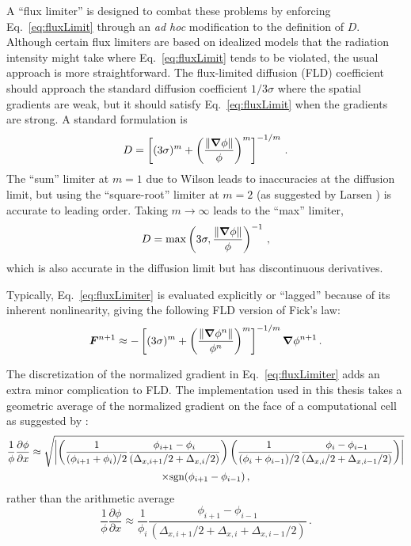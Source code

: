 A ``flux limiter'' is designed to combat these problems by enforcing
Eq.~\eqref{eq:fluxLimit} through an \emph{ad hoc} modification to
the definition of $D$.
Although certain flux limiters \cite{Lev1984} are based on
idealized models that the radiation intensity might take where
Eq.~\eqref{eq:fluxLimit} tends to be violated, the usual approach is more
straightforward. The flux-limited diffusion (FLD) coefficient should approach the
standard diffusion coefficient $1/3\sigma$ where the spatial gradients are weak,
but it should satisfy Eq.~\eqref{eq:fluxLimit} when the gradients are strong.
A standard formulation \cite{Ols2000} is
\begin{equation} \label{eq:fluxLimiter}
  D = \left[ (3\sigma)^{m} + \left( \frac{\left\| \bm{\nabla}
  \phi \right\|}{\phi} \right)^{m}\right]^{-1/m} \,.
\end{equation}
The ``sum'' limiter at $m=1$ due to Wilson \cite{Mor2000} leads to inaccuracies
at the diffusion limit, but using the ``square-root'' limiter at $m=2$ (as
suggested by Larsen \cite{Ols2000}) is accurate to leading order. Taking
$m\to\infty$ leads to the ``max'' limiter,
\begin{equation} \label{eq:fluxLimiterMax}
  D = \max\left( 3\sigma, \frac{\left\| \bm{\nabla} \phi \right\|}{\phi}
  \right)^{-1}\,,
\end{equation}
which is also accurate in the
diffusion limit but has discontinuous derivatives.

Typically, Eq.~\eqref{eq:fluxLimiter} is evaluated explicitly or ``lagged''
because of its inherent nonlinearity, giving the following FLD version of Fick's
law:
\begin{equation*}
  \bm{F}^{n+1} \approx - \left[ (3\sigma)^{m} + \left( \frac{\left\| \bm{\nabla}
  \phi^{n} \right\|}{\phi^{n}} \right)^{m}\right]^{-1/m} \bm{\nabla} \phi^{n+1} \,.
\end{equation*}

The discretization of the normalized gradient in Eq.~\eqref{eq:fluxLimiter}
adds an extra minor complication to FLD. The implementation
used in this thesis takes a geometric average of the normalized gradient on the
face of a computational cell as suggested by \cite{Ols2007}:
\begin{multline*}
 \frac{1}{\phi} \frac{\partial \phi}{\partial x}
  \approx
\sqrt{\left|  \left(  \frac{1}{(\phi_{i+1} + \phi_{i})/2} \frac{\phi_{i+1} - \phi_{i}}
 { (\Delta_{x,i+1}/2 + \Delta_{x,i}/2)} \right)
\left(  \frac{1}{(\phi_{i} + \phi_{i-1})/2} \frac{\phi_{i} - \phi_{i-1}}
{ (\Delta_{x,i}/2 + \Delta_{x,i-1}/2)} \right)  \right|}
\\
\times
 \mathrm{sgn}(\phi_{i+1} - \phi_{i-1})\,,
\end{multline*}
rather than the arithmetic average
\begin{equation*}
 \frac{1}{\phi} \frac{\partial \phi}{\partial x}
  \approx
 \frac{1}{\phi_{i}} \frac{\phi_{i+1} - \phi_{i-1}}
 { (\Delta_{x,i+1}/2 + \Delta_{x,i} + \Delta_{x,i-1}/2)}\,.
\end{equation*}

